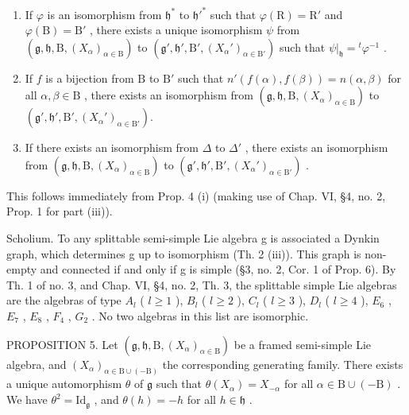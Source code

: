 \begin{enumerate}
\def\labelenumi{(\roman{enumi})}
\item
  If \(\varphi\) is an isomorphism from \(\mathfrak{h}^*\) to \(\mathfrak{h}'^*\) such that \(\varphi(\mathrm{R}) = \mathrm{R}'\) and \(\varphi(\mathrm{B}) = \mathrm{B}'\) , there exists a unique isomorphism \(\psi\) from \((\mathfrak{g}, \mathfrak{h}, \mathrm{B}, (X_{\alpha})_{\alpha \in \mathrm{B}})\) to \((\mathfrak{g}', \mathfrak{h}', \mathrm{B}', (X_{\alpha}')_{\alpha \in \mathrm{B}'})\) such that \(\psi|_{\mathfrak{h}} = {}^t\varphi^{-1}\) .
\item
  If \(f\) is a bijection from \(\mathrm{B}\) to \(\mathrm{B}'\) such that \(n'(f(\alpha), f(\beta)) = n(\alpha, \beta)\) for all \(\alpha, \beta \in \mathrm{B}\) , there exists an isomorphism from \((\mathfrak{g}, \mathfrak{h}, \mathrm{B}, (X_{\alpha})_{\alpha \in \mathrm{B}})\) to \((\mathfrak{g}', \mathfrak{h}', \mathrm{B}', (X_{\alpha}')_{\alpha \in \mathrm{B}'}).\)
\item
  If there exists an isomorphism from \(\Delta\) to \(\Delta'\) , there exists an isomorphism from \((\mathfrak{g},\mathfrak{h},\mathrm{B},(X_{\alpha})_{\alpha \in \mathrm{B}})\) to \((\mathfrak{g}',\mathfrak{h}',\mathrm{B}',(X_{\alpha}')_{\alpha \in \mathrm{B}'})\) .
\end{enumerate}

This follows immediately from Prop. 4 (i) (making use of Chap. VI, §4, no. 2, Prop. 1 for part (iii)).

Scholium. To any splittable semi-simple Lie algebra g is associated a Dynkin graph, which determines g up to isomorphism (Th. 2 (iii)). This graph is non-empty and connected if and only if g is simple (§3, no. 2, Cor. 1 of Prop. 6). By Th. 1 of no. 3, and Chap. VI, §4, no. 2, Th. 3, the splittable simple Lie algebras are the algebras of type \(A_{l}\) ( \(l \geq 1\) ), \(B_{l}\) ( \(l \geq 2\) ), \(C_{l}\) ( \(l \geq 3\) ), \(D_{l}\) ( \(l \geq 4\) ), \(E_{6}\) , \(E_{7}\) , \(E_{8}\) , \(F_{4}\) , \(G_{2}\) . No two algebras in this list are isomorphic.

PROPOSITION 5. Let \((\mathfrak{g},\mathfrak{h},\mathrm{B},(X_{\alpha})_{\alpha \in \mathrm{B}})\) be a framed semi-simple Lie algebra, and \((X_{\alpha})_{\alpha \in \mathrm{B}\cup (-\mathrm{B})}\) the corresponding generating family. There exists a unique automorphism \(\theta\) of \(\mathfrak{g}\) such that \(\theta (X_{\alpha}) = X_{-\alpha}\) for all \(\alpha \in \mathrm{B}\cup (-\mathrm{B})\) . We have \(\theta^2 = \mathrm{Id}_{\mathfrak{g}}\) , and \(\theta (h) = -h\) for all \(h\in \mathfrak{h}\) .

